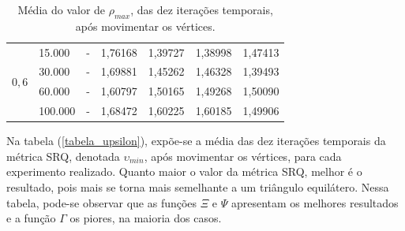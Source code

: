 \begin{table}[!ht]
\begin{center}
\begin{tabular}{|l|l|l|l|l|l|l|}
\hline %
\multirow{4}{*}{$0,6$}
& 15.000 & - & 1,76168 & 1,39727 & 1,38998 & 1,47413 \\
& 30.000 & - & 1,69881 & 1,45262 & 1,46328 & 1,39493 \\
& 60.000 & - & 1,60797 & 1,50165 & 1,49268 & 1,50090 \\
& 100.000 & - & 1,68472 & 1,60225 & 1,60185 & 1,49906 \\
\hline %
\end{tabular}%
\end{center}
\caption{Média do valor de $\rho_{max}$, das dez iterações temporais, após movimentar os vértices.} %
\label{tabela_rho}
\end{table}

Na tabela (\ref{tabela_upsilon}), expõe-se a média das dez iterações temporais da métrica SRQ, denotada $\upsilon_{min}$, após movimentar os vértices, para cada experimento realizado. Quanto maior o valor da métrica SRQ, melhor é o resultado, pois mais se torna mais semelhante a um triângulo equilátero. Nessa tabela, pode-se observar que as funções $\Xi$ e $\Psi$ apresentam os melhores resultados e a função $\Gamma$ os piores, na maioria dos casos.

